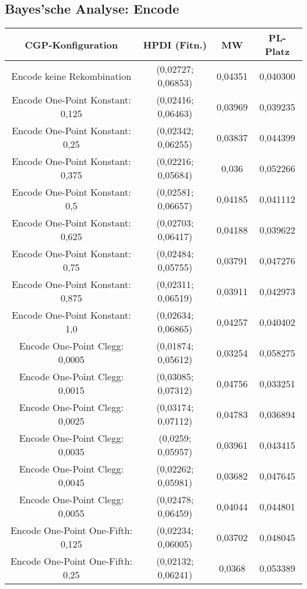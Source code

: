\subsection{Bayes'sche Analyse: Encode}
\label{subsec:bayesEncode}

\begin{table}[H]
	\centering
	\begin{tabular}{c | c | c | c}
		\textbf{CGP-Konfiguration} & \textbf{HPDI (Fitn.)} & \textbf{MW} & \textbf{PL-Platz}\\
		\hline
		Encode keine Rekombination & (0,02727; 0,06853) & 0,04351 & 0,040300\\
		\hline
		Encode One-Point Konstant: 0,125 & (0,02416; 0,06463) & 0,03969 & 0,039235\\
		\hline
		Encode One-Point Konstant: 0,25 & (0,02342; 0,06255) & 0,03837 & 0,044399\\
		\hline
		Encode One-Point Konstant: 0,375 & (0,02216; 0,05684) & 0,036 & 0,052266\\
		\hline
		Encode One-Point Konstant: 0,5 & (0,02581; 0,06657) & 0,04185 & 0,041112\\
		\hline
		Encode One-Point Konstant: 0,625 & (0,02703; 0,06417) & 0,04188 & 0,039622\\
		\hline
		Encode One-Point Konstant: 0,75 & (0,02484; 0,05755) & 0,03791 & 0,047276\\
		\hline
		Encode One-Point Konstant: 0,875 & (0,02311; 0,06519) & 0,03911 & 0,042973\\
		\hline
		Encode One-Point Konstant: 1,0 & (0,02634; 0,06865) & 0,04257 & 0,040402\\
		\hline
		Encode One-Point Clegg: 0,0005 & (0,01874; 0,05612) & 0,03254 & 0,058275\\
		\hline
		Encode One-Point Clegg: 0,0015 & (0,03085; 0,07312) & 0,04756 & 0,033251\\
		\hline
		Encode One-Point Clegg: 0,0025 & (0,03174; 0,07112) & 0,04783 & 0,036894\\
		\hline
		Encode One-Point Clegg: 0,0035 & (0,0259; 0,05957) & 0,03961 & 0,043415\\
		\hline
		Encode One-Point Clegg: 0,0045 & (0,02262; 0,05981) & 0,03682 & 0,047645\\
		\hline
		Encode One-Point Clegg: 0,0055 & (0,02478; 0,06459) & 0,04044 & 0,044801\\
		\hline
		Encode One-Point One-Fifth: 0,125 & (0,02234; 0,06005) & 0,03702 & 0,048045\\
		\hline
		Encode One-Point One-Fifth: 0,25 & (0,02132; 0,06241) & 0,0368 & 0,053389\\

\end{tabular}
\end{table}
